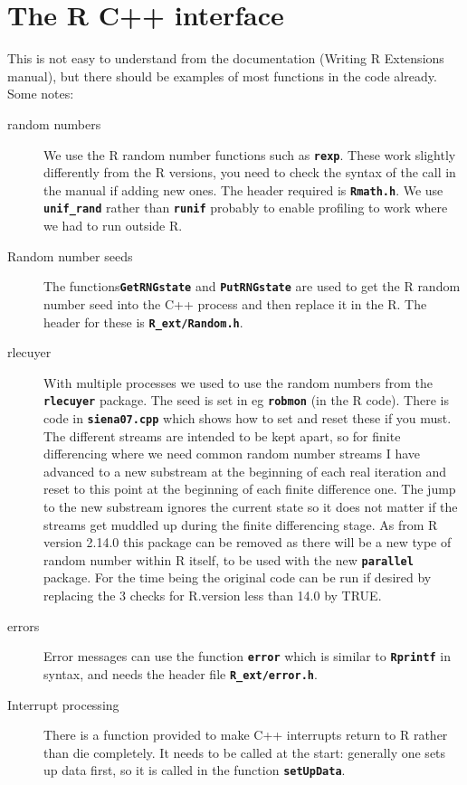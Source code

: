 \documentclass[12pt, a4paper]{article}
\renewcommand{\=}{\,=\,}
\newcommand{\+}{\,+\,}
\newcommand{\sfn}[1]{\textbf{\texttt{#1}}}
\begin{document}
\section{The R C++ interface}
This is not easy to understand from the documentation (Writing R Extensions
manual), but there should be examples of most functions in the code
already. Some notes:
\begin{description}
\item[random numbers]
We use the R random number functions such as \sfn{rexp}. These work slightly
differently from the R versions, you need to check the syntax of the call in
the manual if adding new ones. The header required is \sfn{Rmath.h}. We use
\sfn{unif\_rand} rather than \sfn{runif} probably to enable profiling to
work where we had to run outside R.

\item[Random number seeds] The functions\sfn{GetRNGstate} and
\sfn{PutRNGstate}  are used to get the R random number seed into the C++
process and then replace it in the R. The header for these is
\sfn{R\_ext/Random.h}.
\item[rlecuyer]
With multiple processes we used to use the random numbers from the \sfn{rlecuyer}
package. The seed is set in eg \sfn{robmon} (in the R code). There is code in
\sfn{siena07.cpp} which shows how to set and reset these if you must. The
different streams are intended to be kept apart, so for finite differencing
where we need common random number streams I have advanced to a new substream at
the beginning of each real iteration and reset to this point at the beginning of
each finite difference one. The jump to the new substream ignores the current
state so it does not matter if the streams get muddled up during the finite
differencing stage. As from R version 2.14.0 this package can be removed as
there will be a new type of random number within R itself, to be used with the
new \sfn{parallel} package. For the time being the original code can be run if
desired by replacing the 3 checks for R.version less than 14.0 by TRUE.
\item[errors]
Error messages can use the function \sfn{error} which is similar to
\sfn{Rprintf} in syntax, and needs the header file \sfn{R\_ext/error.h}.
\item[Interrupt processing] There is a function provided to make C++ interrupts
  return to R rather than die completely. It needs to be called at the start:
  generally one sets up data first, so it is called in the function
  \sfn{setUpData}.
\end{description}
\end{document}
